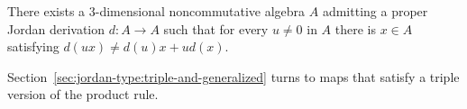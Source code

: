 \begin{example}\label{ex:jordan:bresar-three}
There exists a $3$-dimensional noncommutative algebra $A$ admitting a proper Jordan
derivation $d\colon A\to A$ such that for every $u\neq0$ in $A$ there is $x\in A$
satisfying $d(ux)\neq d(u)x+ud(x)$.
\end{example}

Section~\ref{sec:jordan-type:triple-and-generalized} turns to maps that
satisfy a triple version of the product rule.
